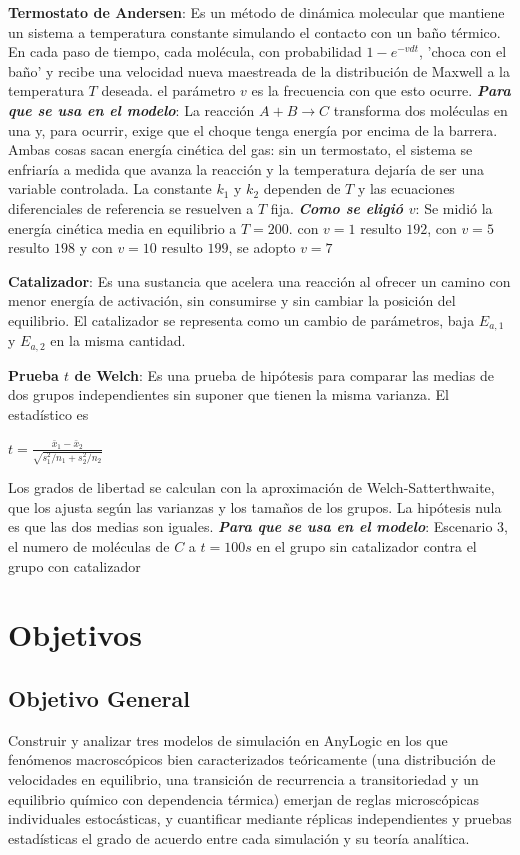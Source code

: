 \documentclass{article}
\begin{document}
\textbf{Termostato de Andersen}: Es un método de dinámica molecular que mantiene un sistema a temperatura constante simulando el contacto con un baño térmico. En cada paso de tiempo, cada molécula, con probabilidad $1-e^{-vdt}$, 
'choca con el baño' y recibe una velocidad nueva maestreada de la distribución de Maxwell a la temperatura $T$ deseada. el parámetro $v$ es la frecuencia con que esto ocurre.
\textit{\textbf{Para que se usa en el modelo}}: La reacción $A+B \rightarrow C$ transforma dos moléculas en una y, para ocurrir, exige que el choque tenga energía por encima de la barrera. Ambas cosas sacan energía cinética del gas: sin un termostato, el sistema se enfriaría a medida que avanza la reacción y la temperatura dejaría de ser una variable controlada. La constante $k_1$ y $k_2$ dependen de $T$ y las ecuaciones diferenciales de referencia se resuelven a $T$ fija.
\textit{\textbf{Como se eligió $v$}}: Se midió la energía cinética media en equilibrio a $T=200$. con $v=1$ resulto $192$, con $v=5$ resulto $198$ y con $v=10$ resulto $199$, se adopto $v=7$ 

\textbf{Catalizador}: Es una sustancia que acelera una reacción al ofrecer un camino con menor energía de activación, sin consumirse y sin cambiar la posición del equilibrio. El catalizador se representa como un cambio de parámetros, baja $E_{a,1}$ y $E_{a,2}$ en la misma cantidad.

\textbf{Prueba $t$ de Welch}: Es una prueba de hipótesis para comparar las medias de dos grupos independientes sin suponer que tienen la misma varianza. El estadístico es
\begin{center}
$t=\frac{\bar{x}_1-\bar{x}_2}{\sqrt{s_1^2/ n_1+s_2^2/ n_2}}$
\end{center}
Los grados de libertad se calculan con la aproximación de Welch-Satterthwaite, que los ajusta según las varianzas y los tamaños de los grupos. La hipótesis nula es que las dos medias son iguales.
\textit{\textbf{Para que se usa en el modelo}}: Escenario 3, el numero de moléculas de $C$ a $t=100s$ en el grupo sin catalizador contra el grupo con catalizador

\section{Objetivos}

\subsection{Objetivo General}
Construir y analizar tres modelos de simulación en AnyLogic en los que fenómenos macroscópicos bien caracterizados teóricamente (una distribución de velocidades en equilibrio, una transición de recurrencia a transitoriedad y un equilibrio químico con dependencia térmica) emerjan de reglas microscópicas individuales estocásticas, y cuantificar mediante réplicas independientes y pruebas estadísticas el grado de acuerdo entre cada simulación y su teoría analítica.
\end{document}
